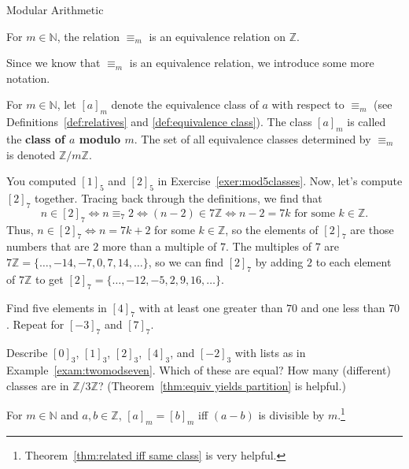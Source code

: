 \begin{section}{Modular Arithmetic}
\begin{theorem}
For  $m\in \mathbb{N}$, the relation $\equiv_m$ is an equivalence relation on $\mathbb{Z}$.
\end{theorem}

Since we know that $\equiv_m$ is an equivalence relation, we introduce some more notation.

\begin{definition}\label{def:modulo}
For  $m\in \mathbb{N}$, let $[a]_m$ denote the equivalence class of $a$ with respect to $\equiv_m$ (see Definitions~\ref{def:relatives} and \ref{def:equivalence class}). The class $[a]_m$ is called the \textbf{class of $a$ modulo $m$}. The set of all equivalence classes determined by  $\equiv_m$ is denoted $\mathbb{Z}/m\mathbb{Z}$.
\end{definition}

\begin{example}\label{exam:twomodseven}
You computed $[1]_5$ and $[2]_5$ in Exercise~\ref{exer:mod5classes}. Now, let's compute $[2]_7$ together. 
Tracing back through the definitions, we find that \[n \in [2]_7 \iff n \equiv_7 2 \iff (n-2)\in 7\mathbb{Z} \iff n-2 = 7k \text{ for some $k\in \mathbb{Z}$}.\] Thus, $n \in [2]_7 \iff n = 7k +2$ for some $k\in \mathbb{Z}$, so the elements of $[2]_7$ are those numbers that are $2$ more than a multiple of $7$. The multiples of $7$ are $7\mathbb{Z} = \{\ldots,-14,-7,0,7,14,\ldots\}$, so we can find $[2]_7$ by adding $2$ to each element of $7\mathbb{Z}$ to get $[2]_7 = \{\ldots,-12,-5,2,9,16,\ldots\}$. 
\end{example}

\begin{exercise}
Find five elements in $[4]_7$ with at least one greater than $70$ and one less than $70$. Repeat for $[-3]_7$ and $[7]_7$.
\end{exercise}

\begin{exercise}
Describe $[0]_3$, $[1]_3$, $[2]_3$, $[4]_3$, and $[-2]_3$ with lists as in Example~\ref{exam:twomodseven}. Which of these are equal?   How many (different) classes are in $\mathbb{Z}/3\mathbb{Z}$? (Theorem~\ref{thm:equiv yields partition} is helpful.)
\end{exercise}

\begin{theorem}\label{thm.congclassesequal}
For  $m\in \mathbb{N}$ and $a,b\in \mathbb{Z}$, $[a]_m = [b]_m$ iff $(a-b)$ is divisible by $m$.\footnote{Theorem~\ref{thm:related iff same class} is very helpful.} 
\end{theorem}


\end{section}
